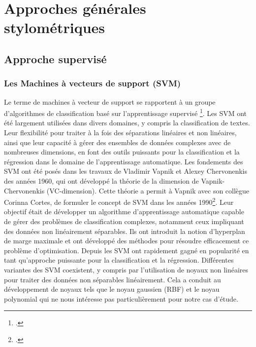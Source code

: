 \part{Approches générales stylométriques}

\chapter{Approche supervisé}

\section{Les Machines à vecteurs de support (SVM)}

Le terme de machines à vecteur de support se rapportent à un groupe d'algorithmes de classification basé sur l'apprentissage supervisé \footcites{noauthor_machine_2023}. 
Les SVM ont été largement utilisées dans divers domaines, y compris la classification de textes. Leur flexibilité pour traiter à la fois des séparations linéaires et non linéaires, ainsi que leur capacité à gérer des ensembles de données complexes avec de nombreuses dimensions, en font des outils puissants pour la classification et la régression dans le domaine de l'apprentissage automatique.
Les fondements des SVM ont été posés dans les travaux de Vladimir Vapnik et Alexey Chervonenkis des années 1960, qui ont développé la théorie de la dimension de Vapnik-Chervonenkis (VC-dimension). Cette théorie a permit à Vapnik avec son collègue Corinna Cortes, de formuler le concept de SVM dans les années 1990\footcites{cortes_support-vector_1995}. Leur objectif était de développer un algorithme d'apprentissage automatique capable de gérer des problèmes de classification complexes, notamment ceux impliquant des données non linéairement séparables. Ils ont introduit la notion d'hyperplan de marge maximale et ont développé des méthodes pour résoudre efficacement ce problème d'optimisation. Depuis les SVM ont rapidement gagné en popularité en tant qu'approche puissante pour la classification et la régression. Différentes variantes des SVM coexistent, y compris par l'utilisation de noyaux non linéaires pour traiter des données non séparables linéairement. Cela a conduit au développement de noyaux tels que le noyau gaussien (RBF) et le noyau polynomial qui ne nous intéresse pas particulièrement pour notre cas d'étude.

